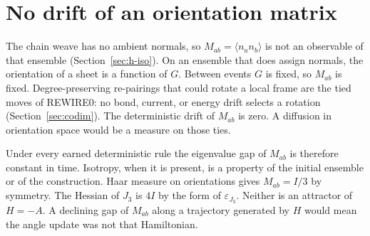 \section{No drift of an orientation matrix}
\label{sec:h-orient}

The chain weave has no ambient normals, so
\(M_{ab}=\langle n_a n_b\rangle\) is not an observable of that ensemble
(Section~\ref{sec:h-iso}).
On an ensemble that does assign normals, the orientation of a sheet is a
function of \(G\).
Between events \(G\) is fixed, so \(M_{ab}\) is fixed.
Degree-preserving re-pairings that could rotate a local frame are the
tied moves of REWIRE0: no bond, current, or energy drift selects a
rotation (Section~\ref{sec:codim}).
The deterministic drift of \(M_{ab}\) is zero.
A diffusion in orientation space would be a measure on those ties.

Under every earned deterministic rule the eigenvalue gap of \(M_{ab}\) is
therefore constant in time.
Isotropy, when it is present, is a property of the initial ensemble or of
the construction.
Haar measure on orientations gives \(M_{ab}=I/3\) by symmetry.
The Hessian of \(J_3\) is \(4I\) by the form of \(\varepsilon_{J_3}\).
Neither is an attractor of \(H=-A\).
A declining gap of \(M_{ab}\) along a trajectory generated by \(H\) would
mean the angle update was not that Hamiltonian.
